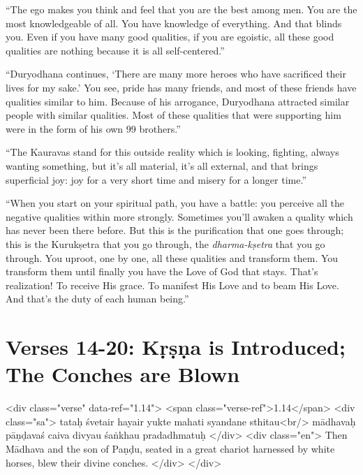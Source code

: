 \enquote{The ego makes you think and feel that you are the best among men. You are the most knowledgeable of all. You have knowledge of everything. And that blinds you. Even if you have many good qualities, if you are egoistic, all these good qualities are nothing because it is all self-centered.}

\enquote{Duryodhana continues, \enquote{There are many more heroes who have sacrificed their lives for my sake.} You see, pride has many friends, and most of these friends have qualities similar to him. Because of his arrogance, Duryodhana attracted similar people with similar qualities. Most of these qualities that were supporting him were in the form of his own 99 brothers.}

\enquote{The Kauravas stand for this outside reality which is looking, fighting, always wanting something, but it’s all material, it’s all external, and that brings superficial joy: joy for a very short time and misery for a longer time.}

\enquote{When you start on your spiritual path, you have a battle: you perceive all the negative qualities within more strongly. Sometimes you’ll awaken a quality which has never been there before. But this is the purification that one goes through; this is the Kurukṣetra that you go through, the \textit{dharma-kṣetra} that you go through. You uproot, one by one, all these qualities and transform them. You transform them until finally you have the Love of God that stays. That’s realization! To receive His grace. To manifest His Love and to beam His Love. And that's the duty of each human being.}

\section{Verses 14-20: Kṛṣṇa is Introduced; The Conches are Blown}\label{sec-verses-14-20-krsna-is-introduced-the-conches-are-blown}


\begin{html}
<div class="verse" data-ref="1.14">
  <span class="verse-ref">1.14</span>
  <div class="sa">
    tataḥ śvetair hayair yukte mahati syandane sthitau<br/>
    mādhavaḥ pāṇḍavaś caiva divyau śaṅkhau pradadhmatuḥ
  </div>
  <div class="en">
    Then Mādhava and the son of Paṇḍu, seated in a great chariot harnessed by white horses, blew their divine conches.
  </div>
</div>
\end{html}



